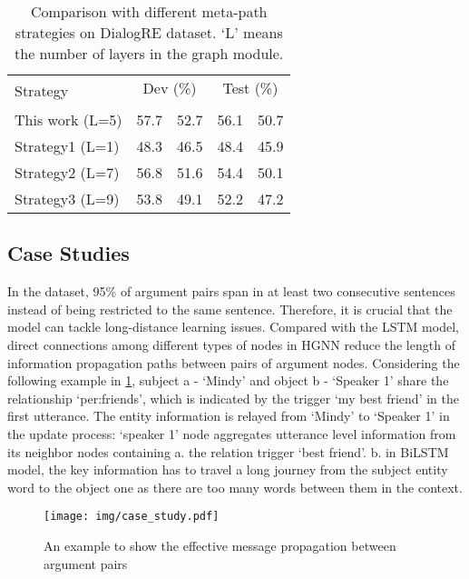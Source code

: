\documentclass[11pt]{article}
\begin{document}
\begin{table}[ht]
\centering
\small
\begin{tabular}{l|cccc}
\toprule
\multirow{2}{*}{Strategy} &
\multicolumn{2}{c}{Dev (\%)} &
\multicolumn{2}{c}{Test (\%)} \\
&  &  &  &  \\
\midrule
 This work (L=5) & 57.7 & 52.7 & 56.1 & 50.7 \\
 Strategy1 (L=1) & 48.3 & 46.5 & 48.4 & 45.9 \\
Strategy2 (L=7) & 56.8 & 51.6 & 54.4 & 50.1 \\
 Strategy3 (L=9) & 53.8 & 49.1 & 52.2 & 47.2 \\
\bottomrule
\end{tabular}
\caption{Comparison with different meta-path strategies on DialogRE dataset. `L' means the number of layers in the graph module. }
\label{tab:effect}
\end{table}



\subsection{Case Studies}
In the dataset, 95\% of argument pairs span in at least two consecutive sentences instead of being restricted to the same sentence.
Therefore, it is crucial that the model can tackle long-distance learning issues.
Compared with the LSTM model,
direct connections among different types of nodes in HGNN reduce the length of information propagation paths between pairs of argument nodes.
Considering the following example in \cref{case_study}, subject a - `Mindy' and object b - `Speaker 1' share the relationship `per:friends', which is indicated by the trigger `my best friend' in the first utterance.
The entity information is relayed from `Mindy' to `Speaker 1' in the update process: `speaker 1' node aggregates utterance level information from its neighbor nodes containing a. the relation trigger `best friend'. b. in BiLSTM model, the key information has to travel a long journey from the subject entity word to the object one as there are too many words between them in the context.



\begin{figure}[t]
\centering
\texttt{[image: img/case\_study.pdf]} \caption{An example to show the effective message propagation between argument pairs}
\label{case_study}
\end{figure}
\end{document}

